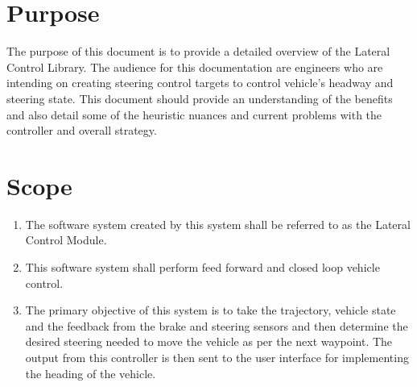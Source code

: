 \documentclass[11pt,letterpaper]{report}
\begin{document}
\section{Purpose}
The purpose of this document is to provide a detailed overview of the
Lateral Control Library. The audience for this documentation are
engineers who are intending on creating steering control targets to
control vehicle's headway and steering state. This document should
provide an understanding of the benefits and also detail some of the
heuristic nuances and current problems with the controller and overall
strategy.

\section{Scope}
\label{sec:scope}

\begin{enumerate}
\item The software system created by this system shall be referred to as
  the Lateral Control Module.
\item This software system shall perform feed forward and closed loop
  vehicle control.
\item The primary objective of this system is to take the trajectory,
  vehicle state and the feedback from the brake and steering sensors and
  then determine the desired steering needed to move the vehicle as per
  the next waypoint. The output from this controller is then sent to the
  user interface for implementing the heading of the vehicle.
\end{enumerate}
\end{document}
